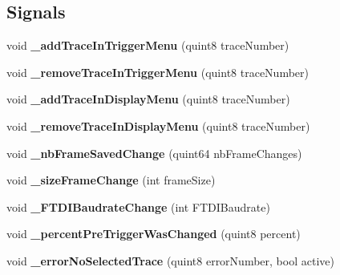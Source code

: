 \subsection*{Signals}
\begin{DoxyCompactItemize}
\item 
\mbox{\label{class_setting_window_a0e7c00ff974b7e052b1f37d88711e506}} 
void {\bfseries \+\_\+add\+Trace\+In\+Trigger\+Menu} (quint8 trace\+Number)
\item 
\mbox{\label{class_setting_window_af68e2f412384d0db51007e91faf95e27}} 
void {\bfseries \+\_\+remove\+Trace\+In\+Trigger\+Menu} (quint8 trace\+Number)
\item 
\mbox{\label{class_setting_window_ae93d160b20cc091ce148cab407a0585c}} 
void {\bfseries \+\_\+add\+Trace\+In\+Display\+Menu} (quint8 trace\+Number)
\item 
\mbox{\label{class_setting_window_a4dfd992ed2255486d062cc1bdb71c7ff}} 
void {\bfseries \+\_\+remove\+Trace\+In\+Display\+Menu} (quint8 trace\+Number)
\item 
\mbox{\label{class_setting_window_af810846e9558b3b516bbd518d032332d}} 
void {\bfseries \+\_\+nb\+Frame\+Saved\+Change} (quint64 nb\+Frame\+Changes)
\item 
\mbox{\label{class_setting_window_a600ded5c4dcba60dea408647e0b4cafe}} 
void {\bfseries \+\_\+size\+Frame\+Change} (int frame\+Size)
\item 
\mbox{\label{class_setting_window_a7553e1c80c81b774025ef4409b46a3c0}} 
void {\bfseries \+\_\+\+F\+T\+D\+I\+Baudrate\+Change} (int F\+T\+D\+I\+Baudrate)
\item 
\mbox{\label{class_setting_window_a0dce160d946da0c81a41cf435877c9d1}} 
void {\bfseries \+\_\+percent\+Pre\+Trigger\+Was\+Changed} (quint8 percent)
\item 
\mbox{\label{class_setting_window_ac79187c9ca7bf8789021c8beca831dc2}} 
void {\bfseries \+\_\+error\+No\+Selected\+Trace} (quint8 error\+Number, bool active)

\end{DoxyCompactItemize}
